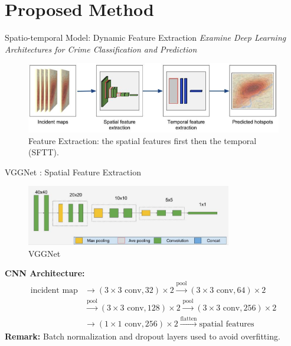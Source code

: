 \documentclass[10pt]{beamer}
\begin{document}
\section{Proposed Method}

\begin{frame}{Spatio-temporal Model: Dynamic Feature Extraction}
\emph{Examine Deep Learning Architectures for Crime Classification and Prediction \citep{stalidis2021examining}}

\begin{figure}
  \centering
    \includegraphics[width=1\textwidth]{SFTT_Feature_Extraction.png}
    \caption{Feature Extraction: the spatial features first then the temporal (SFTT).}
\end{figure}

\end{frame}

\begin{frame}{VGGNet : Spatial Feature Extraction}
\begin{figure}
  \centering
    \includegraphics[width=0.8\textwidth]{VGGNet.jpg}
    \caption{VGGNet \citep{simonyan2014very}}
\end{figure}
{\small
\textbf{CNN Architecture:}
\begin{align*}
    \text{incident map}&\rightarrow
    (3\times 3\text{ conv}, 32) \times 2
    \overset{\text{pool}}{\rightarrow}
    (3\times 3\text{ conv}, 64) \times 2
    \\
    &
    \overset{\text{pool}}{\rightarrow}
    (3\times 3\text{ conv}, 128) \times 2
    \overset{\text{pool}}{\rightarrow}
    (3\times 3\text{ conv}, 256) \times 2
    \\
    &
    \rightarrow
    (1\times 1\text{ conv}, 256) \times 2
    \overset{\text{flatten}}{\rightarrow}
    \text{spatial features}
\end{align*}
}
\centering
{\footnotesize
\textbf{Remark:} Batch normalization and dropout layers used to avoid overfitting.
}


\end{frame}
\end{document}
